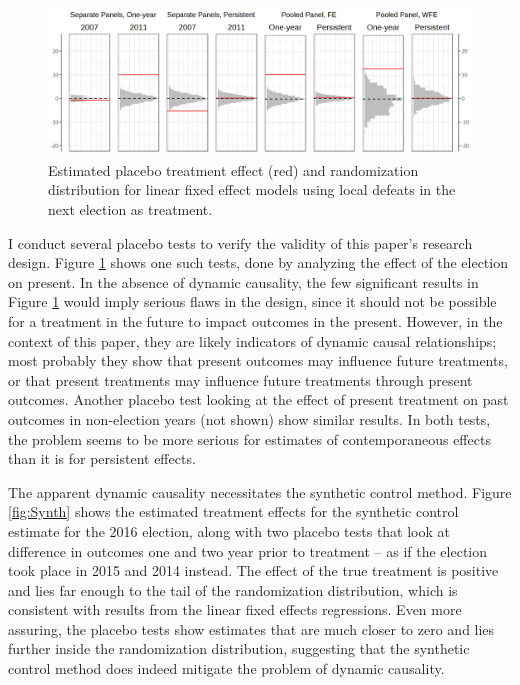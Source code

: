\documentclass[12pt]{article}\usepackage[]{graphicx}\usepackage[]{color}
\newcommand{\1}{\mathbbm{1}}
\begin{document}
\begin{figure}[!htbp]
	\centering
	\includegraphics[width=\textwidth]{figure/SYP_FE_PLACE.png}
	\captionsetup{singlelinecheck=off}
	\caption[Estimated effects of future treatment]{Estimated placebo treatment effect (red) and randomization distribution for linear fixed effect models using local defeats in the next election as treatment.}
	\label{fig:Place}
\end{figure}

I conduct several placebo tests to verify the validity of this paper's research design. Figure \ref{fig:Place} shows one such tests, done by analyzing the effect of the  election on present. In the absence of dynamic causality, the few significant results in Figure \ref{fig:Place} would imply serious flaws in the design, since it should not be possible for a treatment in the future to impact outcomes in the present. However, in the context of this paper, they are likely indicators of dynamic causal relationships; most probably they show that present outcomes may influence future treatments, or that present treatments may influence future treatments through present outcomes. Another placebo test looking at the effect of present treatment on past outcomes in non-election years (not shown) show similar results. In both tests, the problem seems to be more serious for estimates of contemporaneous effects than it is for persistent effects.

The apparent dynamic causality necessitates the synthetic control method. Figure \ref{fig:Synth} shows the estimated treatment effects for the synthetic control estimate for the 2016 election, along with two placebo tests that look at difference in outcomes one and two year prior to treatment -- as if the election took place in 2015 and 2014 instead. The effect of the true treatment is positive and lies far enough to the tail of the randomization distribution, which is consistent with results from the linear fixed effects regressions. Even more assuring, the placebo tests show estimates that are much closer to zero and lies further inside the randomization distribution, suggesting that the synthetic control method does indeed mitigate the problem of dynamic causality.
\end{document}
